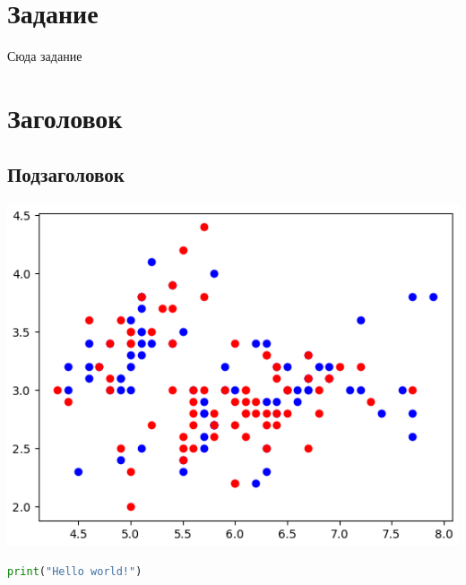\documentclass[a4paper, 12pt]{article}
\begin{document}

\pagebreak
\tableofcontents
\newpage
\section*{Задание}
Сюда задание
\newpage
\section{Заголовок}
\subsection{Подзаголовок}
\begin{center}
    \centering
    \includegraphics[width=.7\linewidth]{includes/output.png}
    \label{fig:prplot}
\end{center}
\begin{lstlisting}[language=Python, caption=листинг]
    print("Hello world!")
\end{lstlisting}
\end{document}
